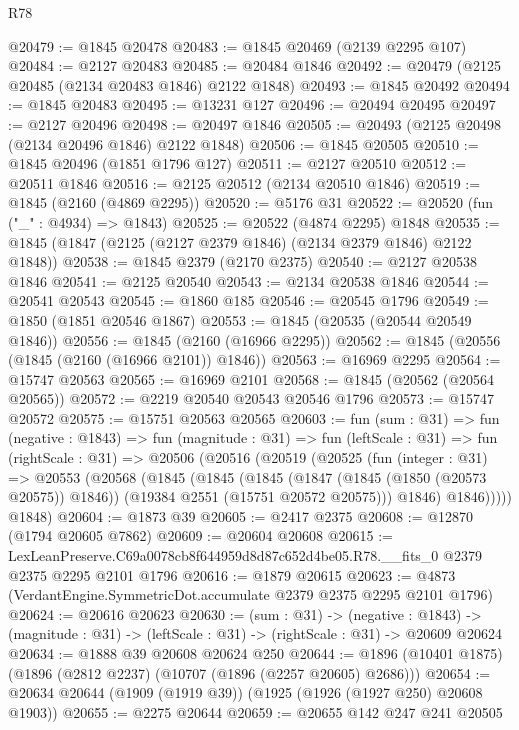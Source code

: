 \begin{lexlean}{R78}
\begin{coremodule}
@20479 := @1845 @20478
@20483 := @1845 @20469 (@2139 @2295 @107)
@20484 := @2127 @20483
@20485 := @20484 @1846
@20492 := @20479 (@2125 @20485 (@2134 @20483 @1846) @2122 @1848)
@20493 := @1845 @20492
@20494 := @1845 @20483
@20495 := @13231 @127
@20496 := @20494 @20495
@20497 := @2127 @20496
@20498 := @20497 @1846
@20505 := @20493 (@2125 @20498 (@2134 @20496 @1846) @2122 @1848)
@20506 := @1845 @20505
@20510 := @1845 @20496 (@1851 @1796 @127)
@20511 := @2127 @20510
@20512 := @20511 @1846
@20516 := @2125 @20512 (@2134 @20510 @1846)
@20519 := @1845 (@2160 (@4869 @2295))
@20520 := @5176 @31
@20522 := @20520 (fun ("_" : @4934) => @1843)
@20525 := @20522 (@4874 @2295) @1848
@20535 := @1845 (@1847 (@2125 (@2127 @2379 @1846) (@2134 @2379 @1846) @2122 @1848))
@20538 := @1845 @2379 (@2170 @2375)
@20540 := @2127 @20538 @1846
@20541 := @2125 @20540
@20543 := @2134 @20538 @1846
@20544 := @20541 @20543
@20545 := @1860 @185
@20546 := @20545 @1796
@20549 := @1850 (@1851 @20546 @1867)
@20553 := @1845 (@20535 (@20544 @20549 @1846))
@20556 := @1845 (@2160 (@16966 @2295))
@20562 := @1845 (@20556 (@1845 (@2160 (@16966 @2101)) @1846))
@20563 := @16969 @2295
@20564 := @15747 @20563
@20565 := @16969 @2101
@20568 := @1845 (@20562 (@20564 @20565))
@20572 := @2219 @20540 @20543 @20546 @1796
@20573 := @15747 @20572
@20575 := @15751 @20563 @20565
@20603 := fun (sum : @31) =>
  fun (negative : @1843) =>
  fun (magnitude : @31) =>
  fun (leftScale : @31) =>
  fun (rightScale : @31) =>
  @20506
    (@20516
      (@20519
        (@20525
          (fun (integer : @31) =>
          @20553
            (@20568
              (@1845
                (@1845
                  (@1845
                    (@1847 (@1845 (@1850 (@20573 @20575)) @1846))
                    (@19384 @2551 (@15751 @20572 @20575)))
                  @1846)
                @1846)))))
      @1848)
@20604 := @1873 @39
@20605 := @2417 @2375
@20608 := @12870 (@1794 @20605 @7862)
@20609 := @20604 @20608
@20615 := LexLeanPreserve.C69a0078cb8f644959d8d87c652d4be05.R78.__fits_0
    @2379
    @2375
    @2295
    @2101
    @1796
@20616 := @1879 @20615
@20623 := @4873 (VerdantEngine.SymmetricDot.accumulate @2379 @2375 @2295 @2101 @1796)
@20624 := @20616 @20623
@20630 := (sum : @31) ->
  (negative : @1843) ->
  (magnitude : @31) -> (leftScale : @31) -> (rightScale : @31) -> @20609 @20624
@20634 := @1888 @39 @20608 @20624 @250
@20644 := @1896 (@10401 @1875) (@1896 (@2812 @2237) (@10707 (@1896 (@2257 @20605) @2686)))
@20654 := @20634 @20644 (@1909 (@1919 @39)) (@1925 (@1926 (@1927 @250) @20608 @1903))
@20655 := @2275 @20644
@20659 := @20655 @142 @247 @241 @20505

\end{coremodule}
\end{lexlean}
